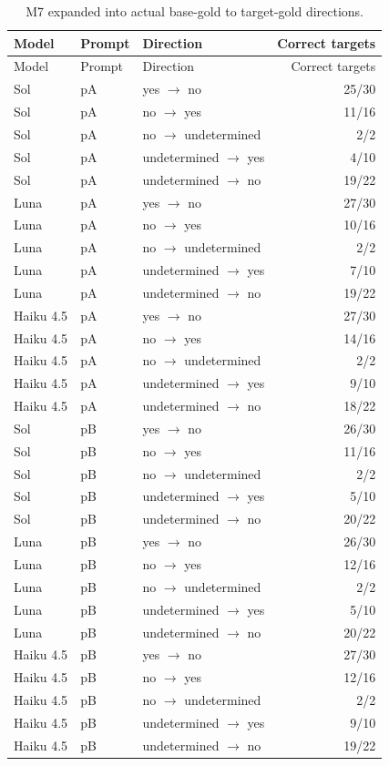 \documentclass[11pt,a4paper]{article}
\begin{document}
\begingroup\small\setlength{\tabcolsep}{4pt}
\begin{longtable}{lllr}
\caption{M7 expanded into actual base-gold to target-gold directions.}\\
\toprule
Model & Prompt & Direction & Correct targets \\
\midrule\endfirsthead
\toprule
Model & Prompt & Direction & Correct targets \\
\midrule\endhead
\bottomrule\endfoot
Sol & pA & yes $\to$ no & 25/30 \\
Sol & pA & no $\to$ yes & 11/16 \\
Sol & pA & no $\to$ undetermined & 2/2 \\
Sol & pA & undetermined $\to$ yes & 4/10 \\
Sol & pA & undetermined $\to$ no & 19/22 \\
Luna & pA & yes $\to$ no & 27/30 \\
Luna & pA & no $\to$ yes & 10/16 \\
Luna & pA & no $\to$ undetermined & 2/2 \\
Luna & pA & undetermined $\to$ yes & 7/10 \\
Luna & pA & undetermined $\to$ no & 19/22 \\
Haiku 4.5 & pA & yes $\to$ no & 27/30 \\
Haiku 4.5 & pA & no $\to$ yes & 14/16 \\
Haiku 4.5 & pA & no $\to$ undetermined & 2/2 \\
Haiku 4.5 & pA & undetermined $\to$ yes & 9/10 \\
Haiku 4.5 & pA & undetermined $\to$ no & 18/22 \\
Sol & pB & yes $\to$ no & 26/30 \\
Sol & pB & no $\to$ yes & 11/16 \\
Sol & pB & no $\to$ undetermined & 2/2 \\
Sol & pB & undetermined $\to$ yes & 5/10 \\
Sol & pB & undetermined $\to$ no & 20/22 \\
Luna & pB & yes $\to$ no & 26/30 \\
Luna & pB & no $\to$ yes & 12/16 \\
Luna & pB & no $\to$ undetermined & 2/2 \\
Luna & pB & undetermined $\to$ yes & 5/10 \\
Luna & pB & undetermined $\to$ no & 20/22 \\
Haiku 4.5 & pB & yes $\to$ no & 27/30 \\
Haiku 4.5 & pB & no $\to$ yes & 12/16 \\
Haiku 4.5 & pB & no $\to$ undetermined & 2/2 \\
Haiku 4.5 & pB & undetermined $\to$ yes & 9/10 \\
Haiku 4.5 & pB & undetermined $\to$ no & 19/22 \\
\end{longtable}\endgroup
\end{document}
